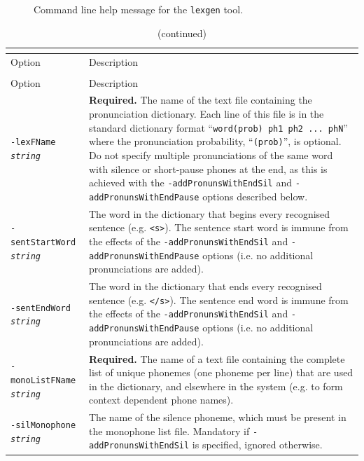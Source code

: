 \documentclass[a4paper,12pt]{report}
\begin{document}
\begin{figure}
\begin{center}
\caption{Command line help message for the {\tt lexgen} tool.}
\label{fig:lexgen_help}
\end{center}
\end{figure}

\begin{center}
\begin{longtable}{lp{9cm}}
\caption{Detailed description of {\tt lexgen} command line options.} \\
\label{tab:lexgen_ref} \\
\hline
Option & Description \\
\hline
\endfirsthead
\caption{(continued)} \\
\hline
Option & Description \\
\hline
\endhead
\hline
\endfoot
{\tt -lexFName \emph{string}} & {\bf Required.} The name of the text file containing the pronunciation dictionary. Each line of this file is in the standard dictionary format ``{\tt word(prob) ph1 ph2 ... phN}'' where the pronunciation probability, ``{\tt (prob)}'', is optional. Do not specify multiple pronunciations of the same word with silence or short-pause phones at the end, as this is achieved with the {\tt -addPronunsWithEndSil} and {\tt -addPronunsWithEndPause} options described below. \\
{\tt -sentStartWord \emph {string}} & The word in the dictionary that begins every recognised sentence (e.g. {\tt <s>}). The sentence start word is immune from the effects of the {\tt -addPronunsWithEndSil} and {\tt -addPronunsWithEndPause} options (i.e. no additional pronunciations are added). \\
{\tt -sentEndWord \emph{string}} & The word in the dictionary that ends every recognised sentence (e.g. {\tt </s>}). The sentence end word is immune from the effects of the {\tt -addPronunsWithEndSil} and {\tt -addPronunsWithEndPause} options (i.e. no additional pronunciations are added). \\
{\tt -monoListFName \emph{string}} & {\bf Required.} The name of a text file containing the complete list of unique phonemes (one phoneme per line) that are used in the dictionary, and elsewhere in the system (e.g. to form context dependent phone names). \\
{\tt -silMonophone \emph{string}} & The name of the silence phoneme, which must be present in the monophone list file. Mandatory if {\tt -addPronunsWithEndSil} is specified, ignored otherwise. \\

\end{longtable}
\end{center}
\end{document}
